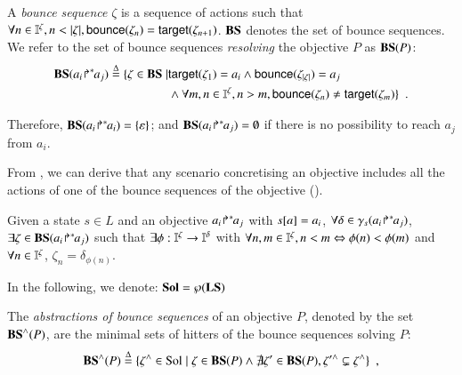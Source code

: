 \begin{definition}\label{def:bs}
A \emph{bounce sequence} $\zeta$  is a sequence of actions such that
$\forall n\in\indexes{\zeta}, n<|\zeta|,
\bounce{\zeta_{n}} = \target{\zeta_{n+1}}$.
$\mathbf{BS}$ denotes the set of bounce sequences.
We refer to the set of bounce sequences \emph{resolving} the objective $P$ as
$\mathbf{BS}(P)$:
\begin{align*}
\mathbf{BS}({a_i\!\Rsh^*\!\!a_j}) \stackrel{\Delta}= \{ \zeta\in\mathbf{BS}\mid & \mathsf{target}(\zeta_1)=a_i\wedge
			    \mathsf{bounce}(\zeta_{|\zeta|})=a_j \\
& \wedge \forall m,n\in\mathbb{I}^{\zeta}, n>m, \mathsf{bounce}(\zeta_n)\neq\mathsf{target}(\zeta_m)
				\}\enspace.
\end{align*}
\end{definition}

Therefore,
$\mathbf{BS}({a_i\!\Rsh^*\!\!a_i}) = \{\varepsilon\}$; and
$\mathbf{BS}({a_i\!\Rsh^*\!\!a_j}) = \emptyset$ if there is no possibility to reach $a_j$ from
$a_i$.


From , we can derive that any scenario concretising an objective includes all the
actions of one of the bounce sequences of the objective ().
\begin{lemma}
Given a state $s\in L$ and an objective ${a_i\!\Rsh^*\!\!a_j}$ with $s[{a}]=a_i$,
$\forall\delta\in\gamma_s({a_i\!\Rsh^*\!\!a_j})$,
$\exists\zeta\in\mathbf{BS}({a_i\!\Rsh^*\!\!a_j})$ such that
$\exists \phi: \mathbb{I}^{\zeta}\to\mathbb{I}^{\delta}$
with
$\forall n,m\in\mathbb{I}^{\zeta}, n<m \Leftrightarrow \phi(n)<\phi(m)$
and
$\forall n\in\mathbb{I}^{\zeta}$, $\zeta_n = \delta_{\phi(n)}$.
\label{lem:bs-concr}
\end{lemma}

In the following, we denote: $\mathbf{Sol} = \wp(\mathbf{LS})$
%
%

\begin{definition}[$\aBS:\Obj \rightarrow \powerset(\Sol)$]
\label{def:aBS}
  The \emph{abstractions of bounce sequences} of an objective $P$, denoted by the set $\mathbf{BS}^\wedge(P)$, are the minimal sets of hitters of the bounce sequences solving $P$:
  \[
    \mathbf{BS}^\wedge(P) \stackrel{\Delta}= \{ \zeta^\wedge \in \mathrm{Sol} \mid
      \zeta \in \mathbf{BS}(P) \wedge
      \nexists \zeta' \in \mathbf{BS}(P), \zeta'^\wedge \subsetneq \zeta^\wedge \} \enspace,
  \]
  
  \noindent
\end{definition}


